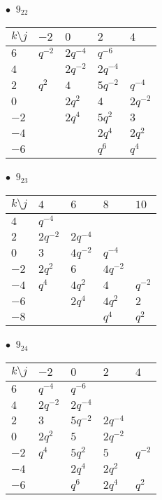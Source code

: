 %
\begin{minipage}{\linewidth}
$\bullet\ $ $9_{22}$ \vspace{0.5em} \\
\begin{tabular}{l|llll}
$k \setminus j$ & $-2$ & $0$ & $2$ & $4$ \\
\hline
$6$ & $q^{-2}$ & $2q^{-4}$ & $q^{-6}$ &  \\
$4$ &  & $2q^{-2}$ & $2q^{-4}$ &  \\
$2$ & $q^{2}$ & $4$ & $5q^{-2}$ & $q^{-4}$ \\
$0$ &  & $2q^{2}$ & $4$ & $2q^{-2}$ \\
$-2$ &  & $2q^{4}$ & $5q^{2}$ & $3$ \\
$-4$ &  &  & $2q^{4}$ & $2q^{2}$ \\
$-6$ &  &  & $q^{6}$ & $q^{4}$ \\
\end{tabular}
\vspace{2em}
\end{minipage}
%
\begin{minipage}{\linewidth}
$\bullet\ $ $9_{23}$ \vspace{0.5em} \\
\begin{tabular}{l|llll}
$k \setminus j$ & $4$ & $6$ & $8$ & $10$ \\
\hline
$4$ & $q^{-4}$ &  &  &  \\
$2$ & $2q^{-2}$ & $2q^{-4}$ &  &  \\
$0$ & $3$ & $4q^{-2}$ & $q^{-4}$ &  \\
$-2$ & $2q^{2}$ & $6$ & $4q^{-2}$ &  \\
$-4$ & $q^{4}$ & $4q^{2}$ & $4$ & $q^{-2}$ \\
$-6$ &  & $2q^{4}$ & $4q^{2}$ & $2$ \\
$-8$ &  &  & $q^{4}$ & $q^{2}$ \\
\end{tabular}
\vspace{2em}
\end{minipage}
%
\begin{minipage}{\linewidth}
$\bullet\ $ $9_{24}$ \vspace{0.5em} \\
\begin{tabular}{l|llll}
$k \setminus j$ & $-2$ & $0$ & $2$ & $4$ \\
\hline
$6$ & $q^{-4}$ & $q^{-6}$ &  &  \\
$4$ & $2q^{-2}$ & $2q^{-4}$ &  &  \\
$2$ & $3$ & $5q^{-2}$ & $2q^{-4}$ &  \\
$0$ & $2q^{2}$ & $5$ & $2q^{-2}$ &  \\
$-2$ & $q^{4}$ & $5q^{2}$ & $5$ & $q^{-2}$ \\
$-4$ &  & $2q^{4}$ & $2q^{2}$ &  \\
$-6$ &  & $q^{6}$ & $2q^{4}$ & $q^{2}$ \\
\end{tabular}
\vspace{2em}
\end{minipage}
